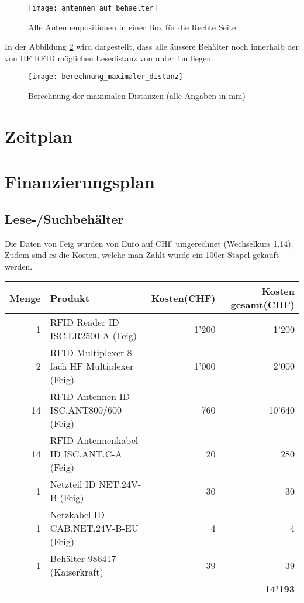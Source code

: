 \begin{figure}
	\centering
	\texttt{[image: antennen\_auf\_behaelter]}
	\caption{Alle Antennenpositionen in einer Box für die Rechte Seite}
	\label{fig:antennenPositionen}
\end{figure}

In der Abbildung \ref{fig:distanzcalc} wird dargestellt, dass alle äussere Behälter noch innerhalb der von HF RFID möglichen Lesedistanz von unter 1m liegen.

\begin{figure}
	\centering
	\texttt{[image: berechnung\_maximaler\_distanz]}
	\caption{Berechnung der maximalen Distanzen (alle Angaben in mm)}
	\label{fig:distanzcalc}
\end{figure}

\chapter{Zeitplan}

\chapter{Finanzierungsplan}
\section{Lese-/Suchbehälter}
Die Daten von Feig wurden von Euro auf CHF umgerechnet (Wechselkurs 1.14). Zudem sind es die Kosten, welche man Zahlt würde ein 100er Stapel gekauft werden.

\begin{tabularx}{\textwidth}{|r|X|r|r|}
	\hline 
	\textbf{Menge} & \textbf{Produkt} & \textbf{Kosten(CHF)} & \textbf{Kosten gesamt(CHF)} \\
	\hline 
	1 & RFID Reader ID ISC.LR2500-A (Feig) & 1'200 & 1'200 \\ 
	\hline 
	2 & RFID Multiplexer 8-fach HF Multiplexer (Feig) & 1'000 & 2'000 \\ 
	\hline 
	14 & RFID Antennen ID ISC.ANT800/600 (Feig)& 760 & 10'640 \\
	\hline
	14 & RFID Antennenkabel ID ISC.ANT.C-A (Feig) & 20 & 280 \\
	\hline
	1 & Netzteil ID NET.24V-B (Feig) & 30 & 30 \\
	\hline
	1 & Netzkabel ID CAB.NET.24V-B-EU (Feig) & 4 & 4 \\
	\hline
	1 & Behälter 986417 (Kaiserkraft) & 39 & 39 \\
	\hline
	& & & \textbf{14'193} \\
	\hline
\end{tabularx} 
